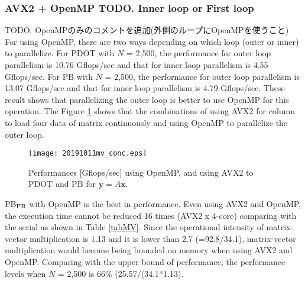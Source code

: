 \documentclass{IOS-Book-Article}
\begin{document}
\subsubsection{AVX2 + OpenMP TODO. Inner loop or First loop}
TODO. OpenMPのみのコメントを追加(外側のループにOpenMPを使うこと)
For using OpenMP, there are two ways depending on which loop (outer or inner) to parallelize. 
For PDOT with $N$ = 2,500, the performance for outer loop parallelism is 10.76 Gflops/sec and that for inner loop parallelism is 4.55 Gflops/sec.
For PB with $N$ = 2,500, the performance for outer loop parallelism is 13.07 Gflops/sec and that for inner loop parallelism is 4.79 Gflops/sec.
These result shows that parallelizing the outer loop is better to use OpenMP for this operation. 
The Figure \ref{figMM} shows that the combinations of using AVX2 for column to load four data of matrix continuously and using OpenMP to parallelize the outer loop.

\begin{figure}[htbp]
  \begin{center}
    \texttt{[image: 20191011mv\_conc.eps]}
        \caption{Performances [Gflops/sec] using OpenMP, and using AVX2 to PDOT and PB for $\bm{y} = A\bm{x}$.}
    \label{figMM}
  \end{center}
\end{figure}


PB$_{\rm{PB}}$ with OpenMP is the best in performance. 
Even using AVX2 and OpenMP, the execution time cannot be reduced 16 times (AVX2 x 4-core) comparing with the serial as shown in Table \ref{tabMV}. 
Since the operational intensity of matrix-vector multiplication is 1.13 and it is lower than 2.7 (=92.8/34.1), matrix-vector multiplication would become being bounded on memory when using AVX2 and OpenMP.
Comparing with the upper bound of performance, the performance levels when $N$ = 2,500 is 66\% (25.57/(34.1*1.13).
\end{document}
